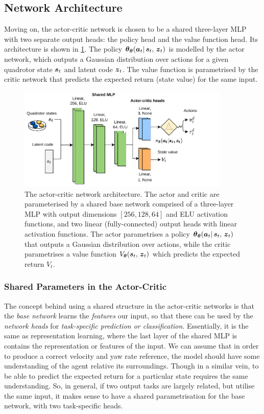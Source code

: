 \subsection{Network Architecture}
\label{subsec:5_MLP_architecture}
Moving on, the actor-critic network is chosen to be a shared three-layer MLP with two separate output heads: the policy head and the value function head.  Its architecture is shown in \cref{fig:5_actor_critic}. The policy $\boldsymbol{\theta}_{\boldsymbol{\theta}}({\boldsymbol{a}}_t |\, {\boldsymbol{s}}_t, \, {\boldsymbol{z}}_t)$ is modelled by the actor network, which outputs a Gaussian distribution over actions for a given quadrotor state ${\boldsymbol{s}}_t$ and latent code ${\boldsymbol{z}}_t$. The value function is parametrised by the critic network that predicts the expected return (state value) for the same input.
\begin{figure}[hbt]
    \centering
    \includegraphics[width=0.9\textwidth]{figures/5_/5_actor_critic.pdf}
    \caption{The actor-critic network architecture. The actor and critic are parameterised by a shared base network comprised of a three-layer MLP with output dimensions $[256, 128, 64]$ and ELU activation functions, and two linear (fully-connected) output heads with linear activation functions. The actor parametrises a policy $\boldsymbol{\theta}_{\boldsymbol{\theta}}({\boldsymbol{a}}_t |\, {\boldsymbol{s}}_t, \, {\boldsymbol{z}}_t)$ that outputs a Gaussian distribution over actions, while the critic parametrises a value function $V_{\boldsymbol{\theta}} ({\boldsymbol{s}}_t, \, {\boldsymbol{z}}_t)$ which predicts the expected return $V_t$.}
    \label{fig:5_actor_critic}
\end{figure}

\subsubsection{Shared Parameters in the Actor-Critic}
The concept behind using a shared structure in the actor-critic networks is that the \textit{base network} learns the \textit{features} our input, so that these can be used by the \textit{network heads} for \textit{task-specific prediction or classification}. Essentially, it is the same as representation learning, where the last layer of the shared MLP is contains the representation or features of the input. 
We can assume that in order to produce a correct velocity and yaw rate reference, the model should have some understanding of the agent relative its surroundings. Though in a similar vein, to be able to predict the expected return for a particular state requires the same understanding. So, in general, if two output tasks are largely related, but utilise the same input, it makes sense to have a shared parametrisation for the base network, with two task-specific heads.

